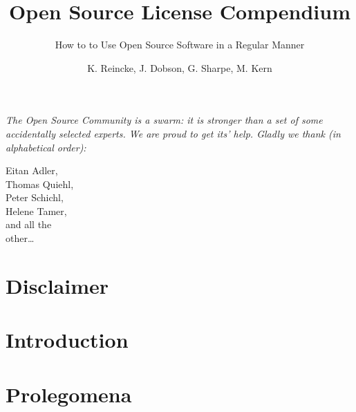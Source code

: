 \documentclass[DIV=calc,BCOR=5mm,12pt,headings=small,oneside,abstract=true,
toc=bib]{scrbook}
\begin{document}
\nocite{*}

\titlehead{Release }
\subject{\small \itshape A Practical Guide for Developers, Managers, Companies,
and OS Experts}
\title{Open Source License Compendium}
\subtitle{How to to Use Open Source Software in a Regular Manner}
\author{K. Reincke, J. Dobson, G. Sharpe, M. Kern}
\maketitle

\footnotesize
\begin{flushright} 

\parbox{100mm}{\itshape
The Open Source Community is a swarm: it is stronger than a set of some
accidentally selected experts. We are proud to get its' help. Gladly we thank
(in alphabetical order):
}

\parbox{50mm}{
\tiny
\begin{flushright}
Eitan Adler,\\
Thomas Quiehl,\\
Peter Schichl,\\
Helene Tamer,\\
and all the \\
other\ldots
\end{flushright}
}
\end{flushright}
\normalsize
\newpage

\footnotesize
\tableofcontents
\newpage

\normalsize

\chapter*{Disclaimer}


\chapter{Introduction}



\chapter{Prolegomena}


%
\end{document}

